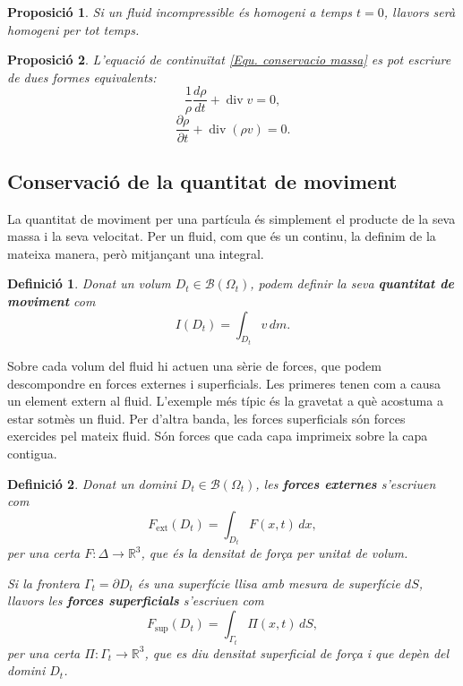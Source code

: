 \documentclass{article}
\numberwithin{equation}{section}
\DeclareMathOperator{\diver}{div}
\newtheorem{definicio}{Definici\'{o}}[section]
\newtheorem{proposicio}{Proposici\'{o}}[section]
\begin{document}
\begin{proposicio}\label{Pro: homogeni inicial}
Si un fluid incompressible \'{e}s homogeni a temps $t=0$, llavors ser\`{a} homogeni per tot temps.
\end{proposicio}

\begin{proposicio}\label{Pro: conservacio massa final}
L'equaci\'{o} de continu\"{i}tat \eqref{Equ. conservacio massa} es pot escriure de dues formes equivalents:
\begin{equation}
\frac{1}{\rho}\frac{d\rho}{dt}+\diver v=0,
\end{equation}
\begin{equation}
\frac{\partial\rho}{\partial t}+\diver(\rho v)=0.
\end{equation}
\end{proposicio}

\subsection{Conservaci\'{o} de la quantitat de moviment}
La quantitat de moviment per una part\'{i}cula \'{e}s simplement el producte de la seva massa i la seva velocitat. Per un fluid, com que \'{e}s un continu, la definim de la mateixa manera, per\`{o} mitjan\c{c}ant una integral.

\begin{definicio}\label{Def: quantitat moviment}
Donat un volum $D_t\in\mathcal{B}(\Omega_t)$, podem definir la seva \textbf{quantitat de moviment} com
\begin{equation}
I(D_t)=\int_{D_t}v\,dm.
\end{equation}
\end{definicio}

Sobre cada volum del fluid hi actuen una s\`{e}rie de forces, que podem descompondre en forces externes i superficials. Les primeres tenen com a causa un element extern al fluid. L'exemple m\'{e}s t\'{i}pic \'{e}s la gravetat a qu\`{e} acostuma a estar sotm\`{e}s un fluid. Per d'altra banda, les forces superficials s\'{o}n forces exercides pel mateix fluid. S\'{o}n forces que cada capa imprimeix sobre la capa contigua.

\begin{definicio}\label{Def: forces}
Donat un domini $D_t\in\mathcal{B}(\Omega_t)$, les \textbf{forces externes} s'escriuen com
\[F_{\text{ext}}(D_t)=\int_{D_t}F(x,t)\,dx,\]
per una certa $F:\Delta\rightarrow\mathbb{R}^3$, que \'{e}s la densitat de for\c{c}a per unitat de volum.

Si la frontera $\Gamma_t=\partial D_t$ \'{e}s una superf\'{i}cie llisa amb mesura de superf\'{i}cie $dS$, llavors les \textbf{forces superficials} s'escriuen com
\[F_{\text{sup}}(D_t)=\int_{\Gamma_t}\Pi(x,t)\,dS,\]
per una certa $\Pi:\Gamma_t\rightarrow\mathbb{R}^3$, que es diu densitat superficial de for\c{c}a i que dep\`{e}n del domini $D_t$.
\end{definicio}
\end{document}
